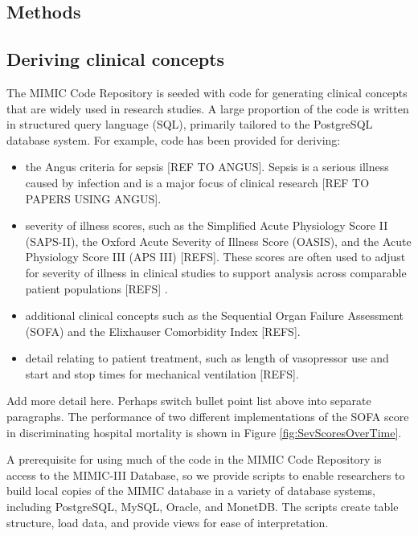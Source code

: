 \documentclass{bioinfo}
\begin{document}
\begin{methods}
\section{Methods}

\subsection{Deriving clinical concepts}

The MIMIC Code Repository is seeded with code for generating clinical concepts that are widely used in research studies. A large proportion of the code is written in structured query language (SQL), primarily tailored to the PostgreSQL database system. For example, code has been provided for deriving:

\begin{itemize}
\item the Angus criteria for sepsis [REF TO ANGUS]. Sepsis is a serious illness caused by infection and is a major focus of clinical research [REF TO PAPERS USING ANGUS].
\item severity of illness scores, such as the Simplified Acute Physiology Score II (SAPS-II), the Oxford Acute Severity of Illness Score (OASIS), and the Acute Physiology Score III (APS III) [REFS]. These scores are often used to adjust for severity of illness in clinical studies to support analysis across comparable patient populations [REFS] .
\item additional clinical concepts such as the Sequential Organ Failure Assessment (SOFA) and the Elixhauser Comorbidity Index [REFS].
\item detail relating to patient treatment, such as length of vasopressor use and start and stop times for mechanical ventilation [REFS].
\end{itemize}

Add more detail here. Perhaps switch bullet point list above into separate paragraphs. The performance of two different implementations of the SOFA score in discriminating hospital mortality is shown in Figure \ref{fig:SevScoresOverTime}.

A prerequisite for using much of the code in the MIMIC Code Repository is access to the MIMIC-III Database, so we provide scripts to enable researchers to build local copies of the MIMIC database in a variety of database systems, including PostgreSQL, MySQL, Oracle, and MonetDB. The scripts create table structure, load data, and provide views for ease of interpretation. 


\end{methods}
\end{document}
